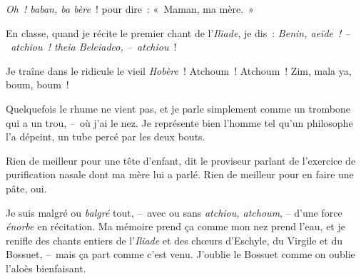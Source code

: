 \documentclass[french,twoside]{book} %
\def\mednobreak{\ifdim\lastskip<\medskipamount
  \removelastskip\nopagebreak\medskip\fi}
\newcommand{\labelblock}[1]{\medbreak{\noindent\color{rubric}\bfseries #1}\par\mednobreak}
\begin{document}
\emph{Oh ! baban, ba bère} ! pour dire : « Maman, ma mère. »\par
En classe, quand je récite le premier chant de l’\emph{Iliade}, je dis : \emph{Benin, aeïde ! – atchiou ! theia Beleiadeo, – atchiou} !\par
Je traîne dans le ridicule le vieil \emph{Hobère} ! Atchoum ! Atchoum ! Zim, mala ya, boum, boum !\par
\bigbreak
\noindent Quelquefois le rhume ne vient pas, et je parle simplement comme un trombone qui a un trou, – où j’ai le nez. Je représente bien l’homme tel qu’un philosophe l’a dépeint, un tube percé par les deux bouts.\par
\bigbreak
\noindent Rien de meilleur pour une tête d’enfant, dit le proviseur parlant de l’exercice de purification nasale dont ma mère lui a parlé. Rien de meilleur pour en faire une pâte, oui.\par
Je suis malgré ou \emph{balgré} tout, – avec ou sans \emph{atchiou, atchoum}, – d’une force \emph{énorbe} en récitation. Ma mémoire prend ça comme mon nez prend l’eau, et je renifle des chants entiers de l’\emph{Iliade} et des chœurs d’Eschyle, du Virgile et du Bossuet, – mais ça part comme c’est venu. J’oublie le Bossuet comme on oublie l’aloès bienfaisant.\par

\labelblock{LES MATHÉMATIQUES}
\end{document}
